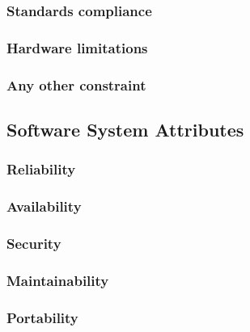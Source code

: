 \subsubsection{Standards compliance}
\subsubsection{Hardware limitations}
\subsubsection{Any other constraint}

\subsection{Software System Attributes}
\subsubsection{Reliability}
\subsubsection{Availability}
\subsubsection{Security}
\subsubsection{Maintainability}
\subsubsection{Portability}
